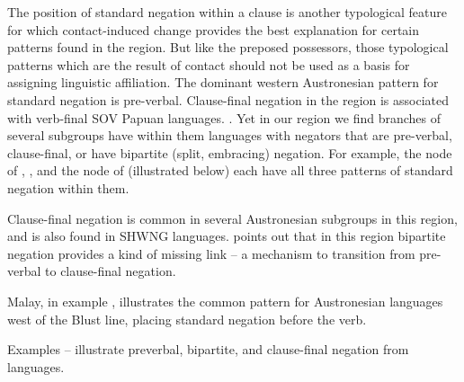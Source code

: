 The position of standard negation within a clause is another
typological feature for which contact-induced change provides
the best explanation for certain patterns found in the region.
But like the preposed possessors,
those typological patterns which are the result of contact should
not be used as a basis for assigning linguistic affiliation.
The dominant western Austronesian pattern for standard negation is pre-verbal.
Clause-final negation in the region is associated with verb-final SOV Papuan languages.
\citep{Reesink2002b,KlamerReesinkVanStaden2008,Florey2010,Dryer2013e,ReesinkDunn2018}.
 Yet in our region we find branches of several subgroups have
within them languages with negators that are pre-verbal,
clause-final, or have bipartite (split, embracing) negation.
For example, the  node of 
\citep{Fricke2017},  \citep{Florey2010}, and the 
node of  (illustrated below) each have all three
patterns of standard negation within them.

Clause-final negation is common in several Austronesian subgroups
in this region, and is also found in SHWNG languages.
\citet{GrimesCIP} points out that in this region bipartite
negation provides a kind of missing link -- a mechanism to transition
from pre-verbal to clause-final negation.

Malay, in example , illustrates the
common pattern for Austronesian
languages west of the Blust line,
placing standard negation before the verb.

\begin{exe}
\setcounter{xnumi}{21}
	\vspace{-1mm}
	\label{ex:02-22}
\end{exe}

Examples -- illustrate preverbal,
bipartite, and clause-final negation from 
languages.

\begin{exe}
	\vspace{-1mm}
	\vspace{-1mm}
\end{exe}

